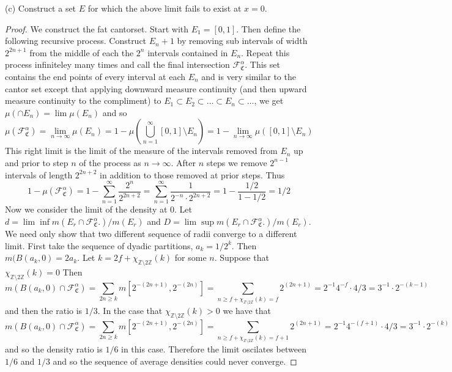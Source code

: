 \documentclass[11pt]{amsart}
\theoremstyle{definition}
\numberwithin{theorem}{section}
\numberwithin{definition}{section}
\numberwithin{equation}{section}
\def\scriptf{{\mathcal F}}
\begin{document}
(c) Construct a set $E$ for which the above limit fails to exist at $x=0$.
\begin{proof}
We construct the fat cantorset. 
Start with $E_1 = [0,1]$. Then define the following recursive process. Construct $E_n+1$ by removing sub intervals of width $2^{2{n+1}}$
from the middle of each the $2^n$ intervals contained in $E_n$. Repeat this process infiniteley many times and call the final intersection $\scriptf_\mathfrak{C}^\alpha.$ This set contains the end points of every interval at each $E_n$ and is very similar to the cantor set except that applying downward measure continuity  (and then upward measure continuity to the compliment) to $E_1 \subset E_2 \subset \dots \subset E_n \subset \dots$, we get $ \mu(\cap E_n) = \lim \mu(E_n)$
and so $$\mu(\scriptf_\mathfrak{C}^\alpha) = \lim_{n\to\infty} \mu\left(E_n\right) = 1 - \mu(\bigcup_{n=1}^\infty [0,1] \setminus E_n) = 1 - \lim_{n \to \infty} \mu([0,1] \setminus E_n)$$
This right limit is the limit of the measure of the intervals removed from $E_n$ up and prior to step $n$ of the process as $n \to \infty.$ After $n$ steps we remove $2^{n-1}$ intervals of length $2^{2n+ 2}$ in addition to those removed at prior steps. Thus
\begin{equation*}
	 1 - \mu(\mathcal{F}_\mathfrak{C}^\alpha) = 1 - \sum_{n=1}^\infty \frac{2^n}{2^{2n+2}} = \sum_{n=1}^\infty \frac{1}{2^{-n}\cdot 2^{2n+2}} = 1 - \frac{1/2}{1- 1/2} = 1/2
\end{equation*}
Now we consider the limit of the density at $0$. Let $d = \lim\inf m(E_r \cap \scriptf_\mathfrak{C}^\alpha.)/m(E_r)$ and $D = \lim\sup  m(E_r \cap \scriptf_\mathfrak{C}^\alpha.)/m(E_r).$
We need only show that two different sequence of radii converge to a different limit. First take the sequence of dyadic partitions, $a_k = 1/2^k.$ Then $m(B(a_k,0) = 2a_k$. Let $k = 2f + \chi_{\mathbb{Z} \setminus 2\mathbb{Z}}(k)$ for some $n$.  Suppose that $\chi_{\mathbb{Z} \setminus 2\mathbb{Z}}(k) = 0$ Then $$m(B(a_k, 0) \cap \mathcal{F}_\mathfrak{C}^\alpha) = \sum_{2n \geq k } m[2^{-(2n + 1)}, 2^{-(2n)}] = \sum_{n \geq f + \chi_{\mathbb{Z} \setminus 2\mathbb{Z}}(k) = f} 2^{(2n + 1)} = 2^{-1}4^{-f}\cdot 4/3 = 3^{-1}\cdot 2^{-(k-1)}$$ and then the ratio is $1/3$. In the case that $\chi_{\mathbb{Z} \setminus 2\mathbb{Z}}(k) > 0$ we have that
$$m(B(a_k, 0) \cap \mathcal{F}_\mathfrak{C}^\alpha) = \sum_{2n \geq k } m[2^{-(2n + 1)}, 2^{-(2n)}] = \sum_{n \geq f+ \chi_{\mathbb{Z} \setminus 2\mathbb{Z}}(k) = f + 1} 2^{(2n + 1)} = 2^{-1}4^{-(f+1)}\cdot 4/3 = 3^{-1}\cdot 2^{-(k)}$$ 
and so the density ratio is $1/6$ in this case. Therefore the limit oscilates between $1/6$ and $1/3$ and so the sequence of average densities could never converge. 
\end{proof}
\end{document}

